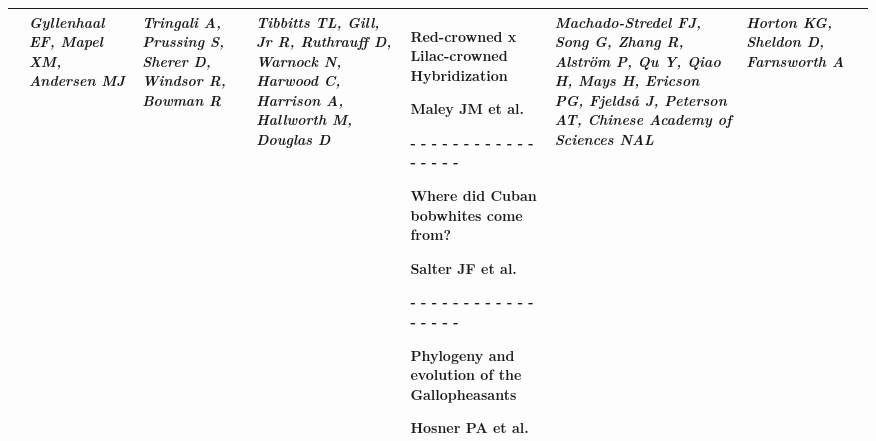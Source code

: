 \begin{tabular}{|x{0.8cm}|x{2.65cm}|x{2.65cm}|a{2.65cm}|x{2.65cm}|x{2.65cm}|x{2.65cm}|@{}m{0pt}@{}}
& \par \vspace{8pt} \textit{Gyllenhaal EF, Mapel XM, Andersen MJ} &  \par \vspace{8pt} \textit{Tringali A, Prussing S, Sherer D, Windsor R, Bowman R} &  \par \vspace{8pt} \textit{Tibbitts TL, Gill, Jr R, Ruthrauff D, Warnock N, Harwood C, Harrison A, Hallworth M, Douglas D} & \scriptsize Red-crowned x Lilac-crowned Hybridization\par \tiny Maley JM et al. \par - - - - - - - - - - - - - - - - - \par \vspace{2pt} \scriptsize Where did Cuban bobwhites come from?\par \tiny Salter JF et al. \par - - - - - - - - - - - - - - - - - \par \vspace{2pt} \scriptsize Phylogeny and evolution of the Gallopheasants\par \tiny Hosner PA et al.  &  \par \vspace{8pt} \textit{Machado-Stredel FJ, Song G, Zhang R, Alström P, Qu Y, Qiao H, Mays H, Ericson PG, Fjeldså J, Peterson AT, Chinese Academy of Sciences NAL} &  \par \vspace{8pt} \textit{Horton KG, Sheldon D, Farnsworth A}&\\[25ex]
\hline

\end{tabular}
